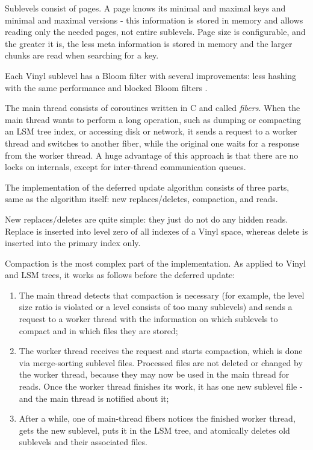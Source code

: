 \documentclass{vldb}
\begin{document}
Sublevels consist of pages. A page knows its minimal and maximal keys and minimal
and maximal versions - this information is stored in memory and allows reading
only the needed pages, not entire sublevels. Page size is configurable, and the
greater it is, the less meta information is stored in memory and the larger chunks are
read when searching for a key.

Each Vinyl sublevel has a Bloom filter with several improvements: less hashing
with the same performance \cite{Kirsch:bloom_less_hashing} and blocked Bloom
filters \cite{Putze:bloom_cache_oblivious}.

The main thread consists of coroutines written in C and called \textit{fibers}. When
the main thread wants to perform a long operation, such as dumping or compacting
an LSM tree index, or accessing disk or network, it sends a request to a worker
thread and switches to another fiber, while the original one waits for a response
from the worker thread. A huge advantage of this approach is that there are no locks
on internals, except for inter-thread communication queues.

The implementation of the deferred update algorithm consists of three parts, same as the
algorithm itself: new replaces/deletes, compaction, and reads.

New replaces/deletes are quite simple: they just do not do any hidden reads. Replace is
inserted into level zero of all indexes of a Vinyl space, whereas delete is inserted into the
primary index only.

Compaction is the most complex part of the implementation. As applied to
Vinyl and LSM trees, it works as follows before the deferred update:
\begin{enumerate}
\item The main thread detects that compaction is necessary (for example, the level
size ratio is violated or a level consists of too many sublevels) and sends a
request to a worker thread with the information on which sublevels to compact and in
which files they are stored;
\item The worker thread receives the request and starts compaction, which is done
via merge-sorting sublevel files. Processed files are not deleted or changed
by the worker thread, because they may now be used in the main thread for reads.
Once the worker thread finishes its work, it has one new sublevel file - and the main
thread is notified about it;
\item After a while, one of main-thread fibers notices the finished worker thread,
gets the new sublevel, puts it in the LSM tree, and atomically deletes old sublevels and
their associated files.
\end{enumerate}
\end{document}
